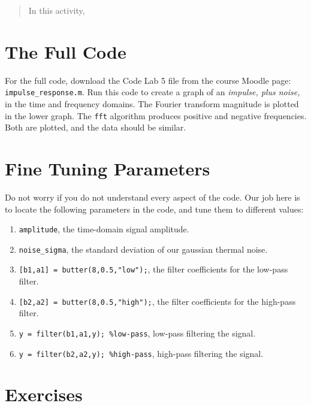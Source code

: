 \documentclass[10.5pt]{article}
\begin{document}
\twocolumn
\maketitle

\begin{abstract}
In this activity, 
\end{abstract}

\section{The Full Code}

For the full code, download the Code Lab 5 file from the course Moodle page: \verb+impulse_response.m+.  Run this code to create a graph of an \textit{impulse, plus noise,} in the time and frequency domains.  The Fourier transform magnitude is plotted in the lower graph.  The \verb+fft+ algorithm produces positive and negative frequencies.  Both are plotted, and the data should be similar.

\section{Fine Tuning Parameters}

Do not worry if you do not understand every aspect of the code.  Our job here is to locate the following parameters in the code, and tune them to different values:

\begin{enumerate}
\item \verb+amplitude+, the time-domain signal amplitude.
\item \verb+noise_sigma+, the standard deviation of our gaussian thermal noise.
\item \verb+[b1,a1] = butter(8,0.5,"low");+, the filter coefficients for the low-pass filter.
\item \verb+[b2,a2] = butter(8,0.5,"high");+, the filter coefficients for the high-pass filter.
\item \verb+y = filter(b1,a1,y); %low-pass+, low-pass filtering the signal.
\item \verb+y = filter(b2,a2,y); %high-pass+, high-pass filtering the signal.
\end{enumerate}

\section{Exercises}
\end{document}
